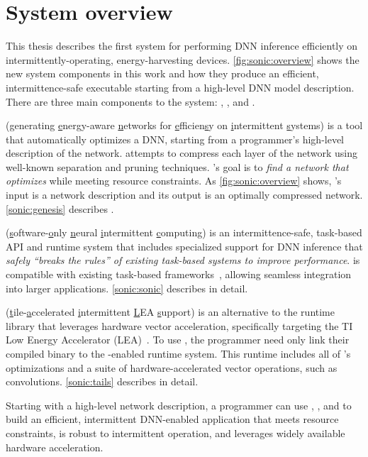 \section{System overview}
\label{sonic:overview}

This thesis describes the first system for performing DNN inference
efficiently on intermittently-operating, energy-harvesting
devices. 
% 
\autoref{fig:sonic:overview} shows the new system components in this work
and how they produce an efficient, intermittence-safe executable starting from
a high-level DNN model description.  
% 
There are three main components to the
system: \genesis, \sonic, and \tails.

\figSONICOverview

\genesis ({\underline g}enerating {\underline e}nergy-aware {\underline n}etworks for {\underline
  e}fficien{\underline s}y on {\underline i}ntermittent {\underline s}ystems) is a tool that automatically
optimizes a DNN, starting from
a programmer's high-level description of the network.  
% 
\genesis attempts to compress each layer of the network using well-known separation and pruning techniques.
% 
\genesis's goal is
to \emph{find a network that optimizes \metric}
while meeting resource
constraints.  
% 
As \autoref{fig:sonic:overview} shows, \genesis's input is
a network description and its output is an optimally compressed network. \autoref{sonic:genesis} describes \genesis.

\sonic ({\underline s}oftware-{\underline o}nly {\underline n}eural {\underline i}ntermittent {\underline
c}omputing) is an intermittence-safe,
task-based API and runtime system that
includes specialized support for DNN inference
that \emph{safely ``breaks the rules'' of existing task-based systems
to improve performance}.
\sonic is compatible with existing task-based
frameworks~\cite{chain,alpaca}, allowing seamless integration into larger applications.
% 
\autoref{sonic:sonic} describes \sonic in detail.

\tails ({\underline t}ile-{\underline a}ccelerated {\underline i}ntermittent {\underline L}EA {\underline
s}upport) is an alternative to the \sonic runtime library that
leverages hardware vector acceleration, specifically targeting the TI Low
Energy Accelerator (LEA)~\cite{lea}.  To use \tails, the
programmer need only link their compiled binary to the \tails-enabled
runtime system.  This runtime includes all of \sonic's optimizations and a
suite of hardware-accelerated vector operations, such as convolutions. 
% 
\autoref{sonic:tails} describes \tails in detail.

Starting with a high-level network description, a
programmer can use \genesis, \sonic, and \tails to build an efficient,
intermittent DNN-enabled application that meets resource constraints, is robust
to intermittent operation, and leverages widely available hardware acceleration.
